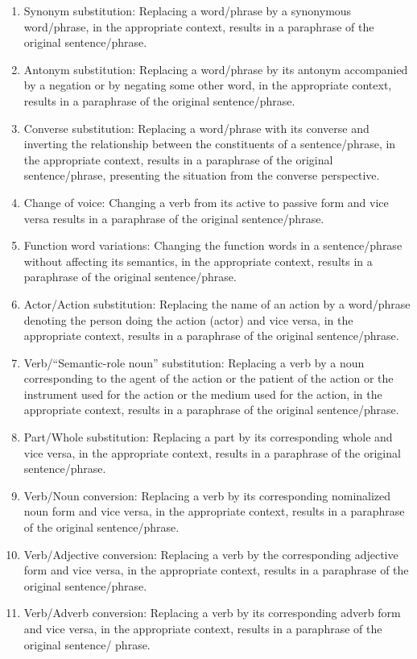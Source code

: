 \begin{enumerate}
    \item Synonym substitution: Replacing a word/phrase by a synonymous word/phrase, in the appropriate context, results in a paraphrase of the original sentence/phrase.
    \item Antonym substitution: Replacing a word/phrase by its antonym accompanied by a negation or by negating some other word, in the appropriate context, results in a paraphrase of the original sentence/phrase.
    \item Converse substitution: Replacing a word/phrase with its converse and inverting the relationship between the constituents of a sentence/phrase, in the appropriate context, results in a paraphrase of the original sentence/phrase, presenting the situation from the converse perspective.
    \item Change of voice: Changing a verb from its active to passive form and vice versa results in a paraphrase of the original sentence/phrase.
    \item Function word variations: Changing the function words in a sentence/phrase without affecting its semantics, in the appropriate context, results in a paraphrase of the original sentence/phrase.
    \item Actor/Action substitution: Replacing the name of an action by a word/phrase denoting the person doing the action (actor) and vice versa, in the appropriate context, results in a paraphrase of the original sentence/phrase.
    \item Verb/“Semantic-role noun” substitution: Replacing a verb by a noun corresponding to the agent of the action or the patient of the action or the instrument used for the action or the medium used for the action, in the appropriate context, results in a paraphrase of the original sentence/phrase.
    \item Part/Whole substitution: Replacing a part by its corresponding whole and vice versa, in the appropriate context, results in a paraphrase of the original sentence/phrase.
    \item Verb/Noun conversion: Replacing a verb by its corresponding nominalized noun form and vice versa, in the appropriate context, results in a paraphrase of the original sentence/phrase.
    \item Verb/Adjective conversion: Replacing a verb by the corresponding adjective form and vice versa, in the appropriate context, results in a paraphrase of the original sentence/phrase.
    \item Verb/Adverb conversion: Replacing a verb by its corresponding adverb form and vice versa, in the appropriate context, results in a paraphrase of the original sentence/ phrase.

\end{enumerate}
